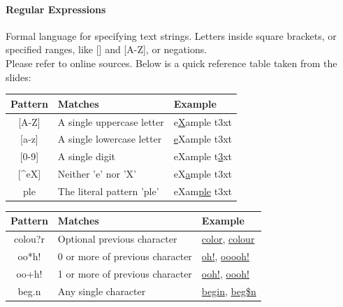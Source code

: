 \documentclass[10pt]{report}
\begin{document}
\paragraph{Regular Expressions}
Formal language for specifying text strings. Letters inside square brackets, or specified ranges, like [] and [A-Z], or negations.\\
Please refer to online sources. Below is a quick reference table taken from the slides:
\begin{multicols}{2}
\begin{center}
	\begin{tabular}{c | l | l}
	\textbf{Pattern} & \textbf{Matches} & \textbf{Example}\\
	\hline
	{[A-Z]} & A single uppercase letter & e\underline{X}ample t3xt\\
	{[a-z]} & A single lowercase letter & \underline{e}Xample t3xt\\
	{[0-9]} & A single digit & eXample t\underline{3}xt\\
	{[\^{}eX]} & Neither 'e' nor 'X' & eX\underline{a}mple t3xt\\
	ple & The literal pattern 'ple' & eXam\underline{ple} t3xt\\
	\end{tabular}
\end{center}
\columnbreak
\begin{center}
	\begin{tabular}{c | l | l}
	\textbf{Pattern} & \textbf{Matches} & \textbf{Example}\\
	\hline
	colou?r & Optional previous character & \underline{color}, \underline{colour}\\
	oo*h! & 0 or more of previous character & \underline{oh!}, \underline{ooooh!}\\
	oo+h! & 1 or more of previous character & \underline{ooh!}, \underline{oooh!}\\
	beg.n & Any single character & \underline{begin}, \underline{beg\$n}
	\end{tabular}
\end{center}
\end{multicols}
\end{document}
